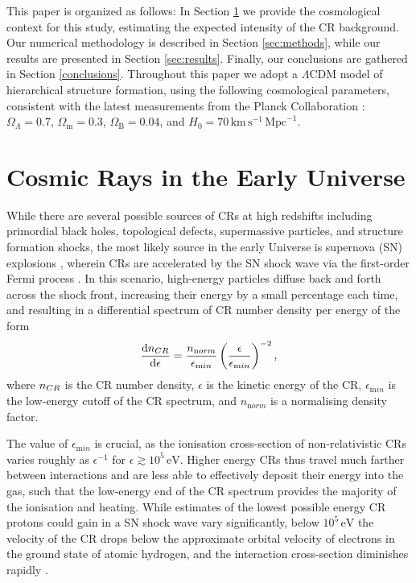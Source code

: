 \documentclass{thesis}
\newcommand{\kms}{\ensuremath{\,\mathrm{km}\,\mathrm{s}^{-1}\xspace}}
\newcommand{\Mpc}{\ensuremath{\,\mathrm{Mpc}}\xspace}
\newcommand{\ev}{\ensuremath{\,\mathrm{eV}}\xspace}
\begin{document}
This paper is organized as follows: In Section \ref{sec:context} we provide the cosmological context for this study, estimating the expected intensity of the CR background. Our numerical methodology is described in Section \ref{sec:methods}, while our results are presented in Section \ref{sec:results}.  
Finally, our conclusions are gathered in Section \ref{conclusions}. Throughout this paper we adopt a $\Lambda$CDM model of hierarchical structure formation, using the following cosmological parameters, consistent with the latest measurements from the Planck Collaboration \citep{PlanckParams2015}: $\Omega_{\Lambda} = 0.7$, $\Omega_{\mathrm m} = 0.3$, $\Omega_{\mathrm B} = 0.04$, and $H_0 = 70 \kms \Mpc^{-1}$.

\section{Cosmic Rays in the Early Universe}
\label{sec:context}
While there are several possible sources of CRs at high redshifts including primordial black holes, topological defects, supermassive particles, and structure formation shocks, the most likely source in the early Universe is supernova (SN) explosions \citep[e.g.,][]{GinzburgSyrovatskii1969,BiermannSigl2001,Stanev2004,Pfrommeretal2006}, wherein CRs are accelerated by the SN shock wave via the first-order Fermi process \citep[e.g.,][]{Bell1978}.  
In this scenario, high-energy particles diffuse back and forth across the shock front, increasing their energy by a small percentage each time, and resulting in a differential spectrum of CR number density per energy \citep{Longair1994} of the form
\begin{equation}
    \frac{{\mathrm d}n_{\mathrm \small CR}}{{\mathrm d}\epsilon} = \frac{n_{\mathrm norm}}{\epsilon_{\mathrm min}}
    \left( \frac{\epsilon}{\epsilon_{\mathrm min}} \right)^{-2},
\end{equation}
where $n_{\mathrm \small CR}$ is the CR number density, $\epsilon$ is the kinetic energy of the CR, $\epsilon_{\mathrm min}$ is the low-energy cutoff of the CR spectrum, and $n_{\mathrm norm}$ is a normalising density factor. 

The value of $\epsilon_{\mathrm min}$ is crucial, as the ionisation cross-section of non-relativistic CRs varies roughly as $\epsilon^{-1}$ for $\epsilon \gtrsim 10^5\ev$. 
Higher energy CRs thus travel much farther between interactions and are less able to effectively deposit their energy into the gas, such that the low-energy end of the CR spectrum provides the majority of the ionisation and heating.  
While estimates of the lowest possible energy CR protons could gain in a SN shock wave vary significantly, below $10^5\ev$ the velocity of the CR drops below the approximate orbital velocity of electrons in the ground state of atomic hydrogen, and the interaction cross-section diminishes rapidly \citep{Schlickeiser2002}. 
\end{document}
